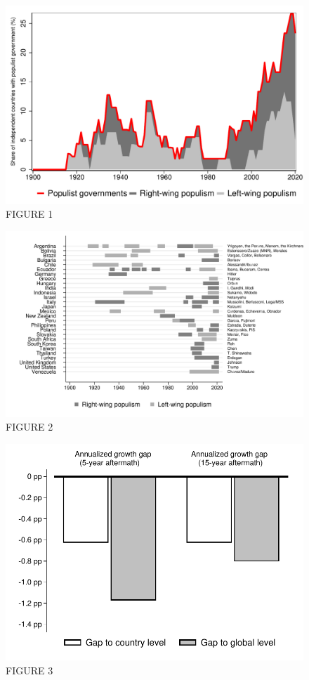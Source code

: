 \documentclass{article}
\begin{document}
\centering

\begin{figure}	
	\caption{FIGURE 1} 
		\includegraphics[scale=0.6]{Figure1}\centering	
\end{figure}

\clearpage

\begin{figure}	
	\caption{FIGURE 2} 
		\includegraphics[scale=0.35]{Figure2}\centering	
\end{figure}

\clearpage

\begin{figure}	
	\caption{FIGURE 3} 
		\includegraphics[scale=0.7]{Figure3}\centering	
\end{figure}
\end{document}
